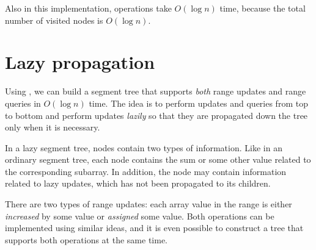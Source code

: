 \begin{center}
\end{center}

Also in this implementation,
operations take $O(\log n)$ time,
because the total number of visited nodes is $O(\log n)$.

\section{Lazy propagation}


Using , we can build
a segment tree that supports \emph{both} range updates
and range queries in $O(\log n)$ time.
The idea is to perform updates and queries
from top to bottom and perform updates
\emph{lazily} so that they are propagated
down the tree only when it is necessary.

In a lazy segment tree, nodes contain two types of
information.
Like in an ordinary segment tree,
each node contains the sum or some other value
related to the corresponding subarray.
In addition, the node may contain information
related to lazy updates, which has not been
propagated to its children.

There are two types of range updates:
each array value in the range is either
\emph{increased} by some value
or \emph{assigned} some value.
Both operations can be implemented using
similar ideas, and it is even possible to construct
a tree that supports both operations at the same time.

